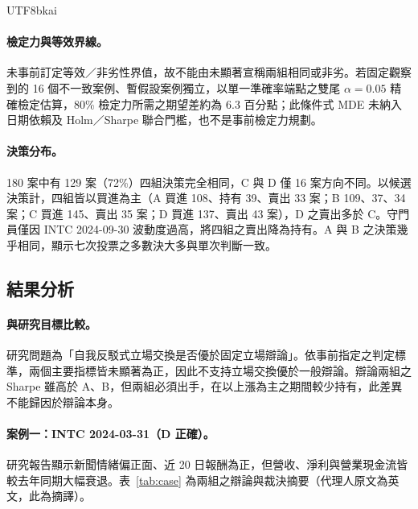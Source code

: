 \documentclass[12pt,a4paper]{article}
\newcommand{\grp}[1]{\textsf{#1}}
\begin{document}
\begin{CJK}{UTF8}{bkai}
\paragraph{檢定力與等效界線。} 未事前訂定等效／非劣性界值，故不能由未顯著宣稱兩組相同或非劣。若固定觀察到的 16 個不一致案例、暫假設案例獨立，以單一準確率端點之雙尾 $\alpha=0.05$ 精確檢定估算，80\% 檢定力所需之期望差約為 6.3 百分點；此條件式 MDE 未納入日期依賴及 Holm／Sharpe 聯合門檻，也不是事前檢定力規劃。

\paragraph{決策分布。} 180 案中有 129 案（72\%）四組決策完全相同，\grp{C} 與 \grp{D} 僅 16 案方向不同。以候選決策計，四組皆以買進為主（\grp{A} 買進 108、持有 39、賣出 33 案；\grp{B} 109、37、34 案；\grp{C} 買進 145、賣出 35 案；\grp{D} 買進 137、賣出 43 案），\grp{D} 之賣出多於 \grp{C}。守門員僅因 INTC 2024-09-30 波動度過高，將四組之賣出降為持有。\grp{A} 與 \grp{B} 之決策幾乎相同，顯示七次投票之多數決大多與單次判斷一致。

\subsection{結果分析}

\paragraph{與研究目標比較。} 研究問題為「自我反駁式立場交換是否優於固定立場辯論」。依事前指定之判定標準，兩個主要指標皆未顯著為正，因此不支持立場交換優於一般辯論。辯論兩組之 Sharpe 雖高於 \grp{A}、\grp{B}，但兩組必須出手，在以上漲為主之期間較少持有，此差異不能歸因於辯論本身。

\paragraph{案例一：INTC 2024-03-31（\grp{D} 正確）。} 研究報告顯示新聞情緒偏正面、近 20 日報酬為正，但營收、淨利與營業現金流皆較去年同期大幅衰退。表~\ref{tab:case} 為兩組之辯論與裁決摘要（代理人原文為英文，此為摘譯）。


\end{CJK}
\end{document}

